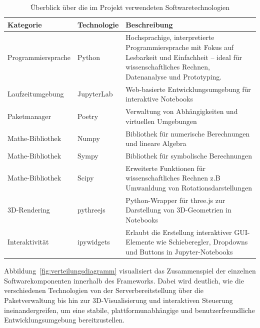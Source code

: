 \vspace{1em}
    \begin{table}[H]
        \centering
        \begin{tabular}{|p{3.5cm}|p{2cm}|p{8cm}|}
        \hline
        Kategorie                   & Technologie                   & Beschreibung  \\ \hline
        Programmiersprache          & Python                        & Hochsprachige, interpretierte Programmiersprache mit Fokus auf Lesbarkeit und Einfachheit – ideal für wissenschaftliches Rechnen, Datenanalyse und Prototyping.        \\ \hline
        Laufzeitumgebung            & JupyterLab                    & Web-basierte Entwicklungsumgebung für interaktive Notebooks        \\ \hline
        Paketmanager                & Poetry                        & Verwaltung von Abhängigkeiten und virtuellen Umgebungen        \\ \hline
        Mathe-Bibliothek            & Numpy                         & Bibliothek für numerische Berechnungen und lineare Algebra        \\ \hline
        Mathe-Bibliothek            & Sympy                         & Bibliothek für symbolische Berechnungen        \\ \hline
        Mathe-Bibliothek            & Scipy                         & Erweiterte Funktionen für wissenschaftliches Rechnen z.B Umwanldung von Rotationsdarstellungen        \\ \hline
        3D-Rendering                & pythreejs                     & Python-Wrapper für three.js zur Darstellung von 3D-Geometrien in Notebooks        \\ \hline
        Interaktivität              & ipywidgets                    & Erlaubt die Erstellung interaktiver GUI-Elemente wie Schieberegler, Dropdowns und Buttons in Jupyter-Notebooks        \\ \hline
        \end{tabular}
        \caption{Überblick über die im Projekt verwendeten Softwaretechnologien}
        \label{tab:technologien}
    \end{table}
\vspace{1em}



Abbildung~\ref{fig:verteilungsdiagramm} visualisiert das Zusammenspiel der einzelnen Softwarekomponenten innerhalb des Frameworks.
Dabei wird deutlich, wie die verschiedenen Technologien von der Serverbereitstellung über die Paketverwaltung bis hin zur 3D-Visualisierung
und interaktiven Steuerung ineinandergreifen, um eine stabile, plattformunabhängige und benutzerfreundliche Entwicklungsumgebung bereitzustellen.

